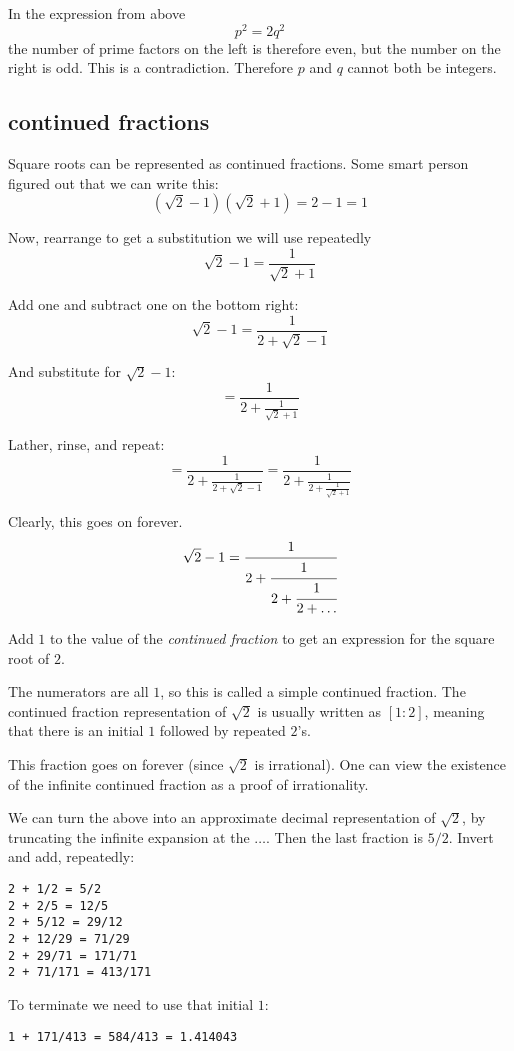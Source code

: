 \documentclass[11pt, oneside]{article}
\begin{document}
In the expression from above
\[ p^2 = 2q^2 \]
the number of prime factors on the left is therefore even, but the number on the right is odd.  This is a contradiction.  Therefore $p$ and $q$ cannot both be integers.

\subsection*{continued fractions}
Square roots can be represented as continued fractions.  Some smart person figured out that we can write this:
\[ (\sqrt{2} - 1)(\sqrt{2} + 1) = 2 - 1 = 1 \]

Now, rearrange to get a substitution we will use repeatedly
\[ \sqrt{2} - 1 = \frac{1}{\sqrt{2} + 1} \]

Add one and subtract one on the bottom right:
\[ \sqrt{2} - 1 =  \frac{1}{2 + \sqrt{2} - 1} \]

And substitute for $\sqrt{2} - 1$:
\[ = \frac{1}{2 + \frac{1}{\sqrt{2} + 1}} \]

Lather, rinse, and repeat:
\[ = \frac{1}{2 + \frac{1}{2 + \sqrt{2} - 1}} = \frac{1}{2 + \frac{1}{2 + \frac{1}{\sqrt{2} + 1} }} \]

Clearly, this goes on forever.
\[ \sqrt{2} - 1 =  \cfrac{1}{2+\cfrac{1}{2+\cfrac{1}{2 + \dots}}}  \]

Add $1$ to the value of the \emph{continued fraction} to get an expression for the square root of $2$.

The numerators are all $1$, so this is called a simple continued fraction.  The continued fraction representation of $\sqrt{2}$ is usually written as $[1:2]$, meaning that there is an initial $1$ followed by repeated $2$'s.

This fraction goes on forever (since $\sqrt{2}$ is irrational).  One can view the existence of the infinite continued fraction as a proof of irrationality.

We can turn the above into an approximate decimal representation of $\sqrt{2}$, by truncating the infinite expansion at the $\dots$.  Then the last fraction is $5/2$.  Invert and add, repeatedly:

\begin{verbatim}
2 + 1/2 = 5/2
2 + 2/5 = 12/5
2 + 5/12 = 29/12
2 + 12/29 = 71/29
2 + 29/71 = 171/71
2 + 71/171 = 413/171
\end{verbatim}

To terminate we need to use that initial $1$:
\begin{verbatim}
1 + 171/413 = 584/413 = 1.414043
\end{verbatim}
\end{document}
